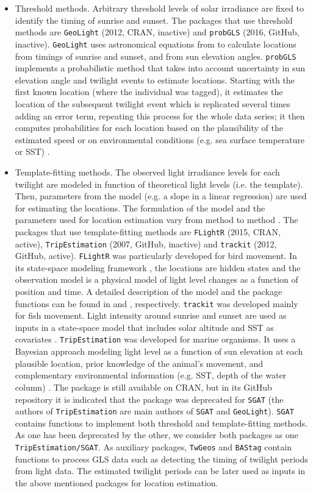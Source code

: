 \documentclass[a4paper,12pt]{article}
\newcommand{\Rpkg}[1]{\texttt{#1}}
\begin{document}
\begin{itemize}
	\item Threshold methods. Arbitrary threshold levels of solar irradiance are fixed to identify the timing of sunrise and sunset. The packages that use threshold methods are \Rpkg{GeoLight} (2012, CRAN, inactive) and \Rpkg{probGLS} (2016, GitHub, inactive). \Rpkg{GeoLight} uses astronomical equations from \cite{Montenbruck2013} to calculate locations from timings of sunrise and sunset, and from sun elevation angles. \Rpkg{probGLS} implements a probabilistic method that takes into account uncertainty in sun elevation angle and twilight events to estimate locations. Starting with the first known location (where the individual was tagged), it estimates the location of the subsequent twilight event which is replicated several times adding an error term, repeating this process for the whole data series; it then computes probabilities for each location based on the plausibility of the estimated speed or on environmental conditions (e.g. sea surface temperature or SST) \citep{Merkel2016}. 
	\item Template-fitting methods. The observed light irradiance levels for each twilight are modeled in function of theoretical light levels (i.e. the template). Then, parameters from the model (e.g. a slope in a linear regression) are used for estimating the locations. The formulation of the model and the parameters used for location estimation vary from method to method \citep{Ekstrom2004}. The packages that use template-fitting methods are \Rpkg{FLightR} (2015, CRAN, active), \Rpkg{TripEstimation} (2007, GitHub, inactive) and \Rpkg{trackit} (2012, GitHub, active). \Rpkg{FLightR} was particularly developed for bird movement. In its state-space modeling framework \citep{Patterson2008}, the locations are hidden states and the observation model is a physical model of light level changes as a function of position and time. A detailed description of the model and the package functions can be found in \cite{Rakhimberdiev2015} and \cite{Rakhimberdiev2017}, respectively. \Rpkg{trackit} was developed mainly for fish movement. Light intensity around sunrise and sunset are used as inputs in a state-space model that includes solar altitude and SST as covariates \citep{Lam2010}. \Rpkg{TripEstimation} was developed for marine organisms. It uses a Bayesian approach modeling light level as a function of sun elevation at each plausible location, prior knowledge of the animal's movement, and complementary environmental information (e.g. SST, depth of the water column) \citep{Sumner2009}. The package is still available on CRAN, but in its GitHub repository it is indicated that the package was deprecated for \Rpkg{SGAT} (the authors of \Rpkg{TripEstimation} are main authors of \Rpkg{SGAT} and \Rpkg{GeoLight}). \Rpkg{SGAT} contains functions to implement both threshold and template-fitting methods. As one has been deprecated by the other, we consider both packages as one \Rpkg{TripEstimation/SGAT}. As auxiliary packages, \Rpkg{TwGeos} and \Rpkg{BAStag} contain functions to process GLS data such as detecting the timing of twilight periods from light data. The estimated twilight periods can be later used as inputs in the above mentioned packages for location estimation.

\end{itemize}
\end{document}

